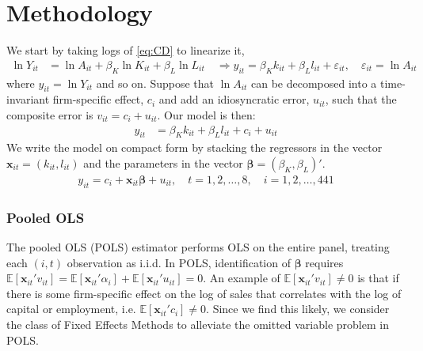 \section{Methodology} \label{sec:methodology}

We start by taking logs of \eqref{eq:CD} to linearize it,
\begin{align*}
    \ln Y_{it} &= \ln A_{it} + \beta_K \ln K_{it} + \beta_L \ln L_{it} \quad \Longrightarrow
    y_{it} = \beta_K k_{it} + \beta_L l_{it} + \varepsilon_{it}, \quad \varepsilon_{it} = \ln A_{it}
\end{align*}
where $y_{it} = \ln Y_{it}$ and so on. Suppose that $\ln A_{it}$ can be decomposed into a time-invariant firm-specific effect, $c_i$ and add an idiosyncratic error, $u_{it}$, such that the composite error is $v_{it} = c_i + u_{it}$. Our model is then:
\begin{align*}
    y_{it} &= \beta_K k_{it} + \beta_L l_{it}+c_i + u_{it}
\end{align*}
We write the model on compact form by stacking the regressors in the vector $\bm{x}_{it} = (k_{it}, l_{it})$ and the parameters in the vector $\bm{\beta} = (\beta_K, \beta_L)'$.
\begin{align} \label{equationline}
    y_{it} = c_i + \bm{x}_{it} \bm{\beta} + u_{it}, \quad t=1,2,\ldots,8, \quad i=1,2,\ldots,441
\end{align}

\subsubsection*{Pooled OLS}
The pooled OLS (POLS) estimator performs OLS on the entire panel, treating each $(i,t)$ observation as i.i.d. In POLS, identification of $\pmb{\beta}$ requires  $\mathbb{E}[\pmb{x}_{it}'v_{it}]=\mathbb{E}[\pmb{x}_{it}'\alpha_{i}]+\mathbb{E}[\pmb{x}_{it}'u_{it}]=0$.
An example of $\mathbb{E}[\pmb{x}_{it}'v_{it}]\neq0$ is that if there is some firm-specific effect on the log of sales that correlates with the log of capital or employment, i.e. $\mathbb{E}[\pmb{x}_{it}'c_{i}]\neq0$. Since we find this likely, we consider the class of Fixed Effects Methods to alleviate the omitted variable problem in POLS.


